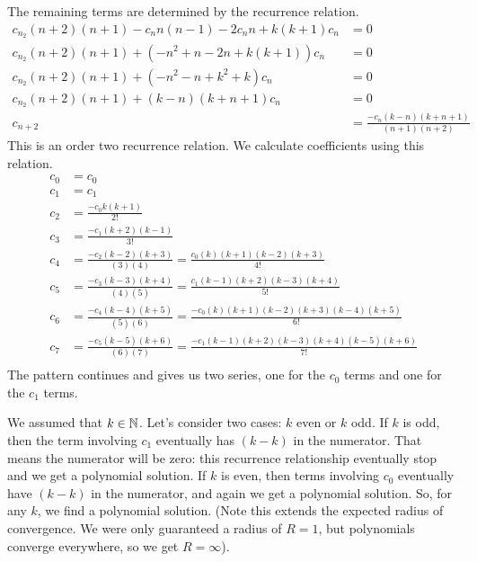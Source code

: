 \documentclass[fleqn,letterpaper]{report}
\begin{document}
The remaining terms are determined by the recurrence relation.
\begin{align*}
c_{n_2} (n+2) (n+1) 
- c_n n(n-1) - 2c_n n + k(k+1) c_n & = 0 \\
c_{n_2} (n+2) (n+1) 
+ (-n^2 + n - 2n + k(k+1)) c_n & = 0 \\
c_{n_2} (n+2) (n+1) 
+ (-n^2 - n + k^2 +k ) c_n & = 0 \\
c_{n_2} (n+2) (n+1) 
+ (k-n)(k+n+1) c_n & = 0 \\
c_{n+2} & = \frac{-c_n (k-n)(k+n+1)}{(n+1)(n+2)} 
\end{align*}
This is an order two recurrence relation. We calculate
coefficients using this relation.
\begin{align*}
c_0 & = c_0 \\
c_1 & = c_1 \\
c_2 & = \frac{-c_0 k (k+1)}{2!} \\
c_3 & = \frac{-c_1 (k+2)(k-1)}{3!} \\
c_4 & = \frac{-c_2 (k-2)(k+3)}{(3)(4)} = \frac{c_0
(k)(k+1)(k-2)(k+3)}{4!} \\
c_5 & = \frac{-c_3 (k-3)(k+4)}{(4)(5)} = \frac{c_1
(k-1)(k+2)(k-3)(k+4)}{5!} \\
c_6 & = \frac{-c_4 (k-4)(k+5)}{(5)(6)} = \frac{-c_0
(k)(k+1)(k-2)(k+3)(k-4)(k+5)}{6!} \\
c_7 & = \frac{-c_5 (k-5)(k+6)}{(6)(7)} = \frac{-c_1
(k-1)(k+2)(k-3)(k+4)(k-5)(k+6)}{7!} \\
\end{align*}
The pattern continues and gives us two series, one for the
$c_0$ terms and one for the $c_1$ terms. 

We assumed that $k \in \mathbb{N}$. Let's consider two cases: $k$
even or $k$ odd. If $k$ is odd, then the term involving $c_1$ 
eventually has $(k-k)$ in the numerator. That means
the numerator will be zero: this recurrence relationship
eventually stop and we get a polynomial solution. If $k$ is
even, then terms involving $c_0$ eventually have $(k-k)$ in the
numerator, and again we get a polynomial solution. So, for any $k$,
we find a polynomial solution. (Note this extends the expected
radius of convergence. We were only guaranteed a radius of
$R=1$, but polynomials converge everywhere, so we get
$R=\infty$).
\end{document}
